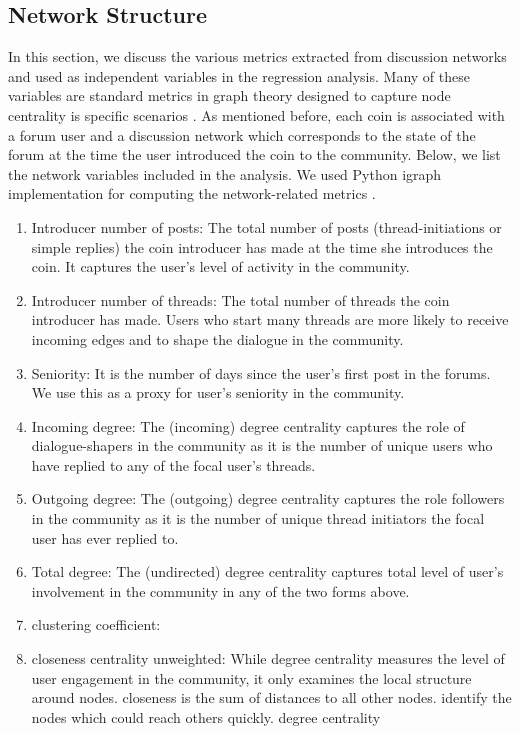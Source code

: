 \subsection{Network Structure}
In this section, we discuss the various metrics extracted from discussion networks and used as independent variables in the regression analysis. Many of these variables are standard metrics in graph theory designed to capture node centrality is specific scenarios \cite{KleinbergNetworks}. As mentioned before, each coin is associated with a forum user and a discussion network which corresponds to the state of the forum at the time the user introduced the coin to the community. Below, we list the network variables included in the analysis. We used Python igraph implementation for computing the network-related metrics \cite{igraph}.
\begin{enumerate}
  \item{Introducer number of posts:} The total number of posts (thread-initiations or simple replies) the coin introducer has made at the time she introduces the coin. It captures the user's level of activity in the community.
  \item{Introducer number of threads:} The total number of threads the coin introducer has made. Users who start many threads are more likely to receive incoming edges and to shape the dialogue in the community.
  \item{Seniority:} It is the number of days since the user's first post in the forums. We use this as a proxy for user's seniority in the community.
  \item{Incoming degree:} The (incoming) degree centrality captures the role of dialogue-shapers in the community as it is the number of unique users who have replied to any of the focal user's threads.
  \item{Outgoing degree:} The (outgoing) degree centrality captures the role followers in the community as it is the number of unique thread initiators the focal user has ever replied to.
  \item{Total degree:} The (undirected) degree centrality captures total level of user's involvement in the community in any of the two forms above.
  \item{clustering coefficient:} 
  \item{closeness centrality unweighted:} While degree centrality measures the level of user engagement in the community, it only examines the local structure around nodes. closeness  is the sum of distances to all other nodes. identify the nodes which could reach others quickly. degree centrality 

\end{enumerate}
